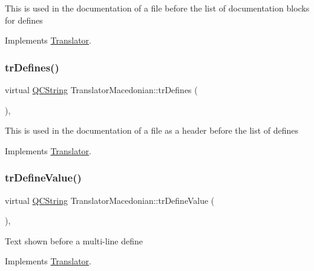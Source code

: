 This is used in the documentation of a file before the list of documentation blocks for defines 

Implements \mbox{\hyperlink{class_translator}{Translator}}.

\mbox{\label{class_translator_macedonian_ae941068c759b6f788ceede7fb23426fb}} 
\subsubsection{\texorpdfstring{trDefines()}{trDefines()}}
{\footnotesize\ttfamily virtual \mbox{\hyperlink{class_q_c_string}{Q\+C\+String}} Translator\+Macedonian\+::tr\+Defines (\begin{DoxyParamCaption}{ }\end{DoxyParamCaption})\hspace{0.3cm}{\ttfamily [inline]}, {\ttfamily [virtual]}}

This is used in the documentation of a file as a header before the list of defines 

Implements \mbox{\hyperlink{class_translator}{Translator}}.

\mbox{\label{class_translator_macedonian_a2eee8671c27c46deffc9d9f5dba57b21}} 
\subsubsection{\texorpdfstring{trDefineValue()}{trDefineValue()}}
{\footnotesize\ttfamily virtual \mbox{\hyperlink{class_q_c_string}{Q\+C\+String}} Translator\+Macedonian\+::tr\+Define\+Value (\begin{DoxyParamCaption}{ }\end{DoxyParamCaption})\hspace{0.3cm}{\ttfamily [inline]}, {\ttfamily [virtual]}}

Text shown before a multi-\/line define 

Implements \mbox{\hyperlink{class_translator}{Translator}}.

\mbox{\label{class_translator_macedonian_a9d7f360455d403f14d654636bea1ba66}} 
